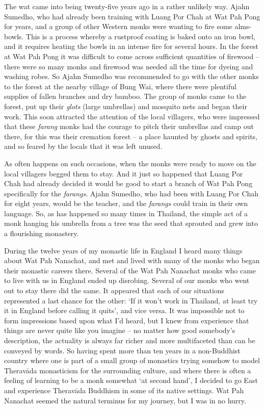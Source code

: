 The wat came into being twenty-five years ago in a rather unlikely way.
Ajahn Sumedho, who had already been training with Luang Por Chah at Wat
Pah Pong for years, and a group of other Western monks were wanting to
fire some alms-bowls. This is a process whereby a rustproof coating is
baked onto an iron bowl, and it requires heating the bowls in an intense
fire for several hours. In the forest at Wat Pah Pong it was difficult
to come across sufficient quantities of firewood -- there were so many
monks and firewood was needed all the time for dyeing and washing robes.
So Ajahn Sumedho was recommended to go with the other monks to the
forest at the nearby village of Bung Wai, where there were plentiful
supplies of fallen branches and dry bamboo. The group of monks came to
the forest, put up their \emph{glots} (large umbrellas) and mosquito
nets and began their work. This soon attracted the attention of the
local villagers, who were impressed that these \emph{farang} monks had
the courage to pitch their umbrellas and camp out there, for this was
their cremation forest -- a place haunted by ghosts and spirits, and so
feared by the locals that it was left unused.

As often happens on such occasions, when the monks were ready to move on
the local villagers begged them to stay. And it just so happened that
Luang Por Chah had already decided it would be good to start a branch of
Wat Pah Pong specifically for the \emph{farangs}. Ajahn Sumedho, who had
been with Luang Por Chah for eight years, would be the teacher, and the
\emph{farangs} could train in their own language. So, as has happened so
many times in Thailand, the simple act of a monk hanging his umbrella
from a tree was the seed that sprouted and grew into a flourishing
monastery.

During the twelve years of my monastic life in England I heard many
things about Wat Pah Nanachat, and met and lived with many of the monks
who began their monastic careers there. Several of the Wat Pah Nanachat
monks who came to live with us in England ended up disrobing. Several of
our monks who went out to stay there did the same. It appeared that each
of our situations represented a last chance for the other: `If it won't
work in Thailand, at least try it in England before calling it quits',
and vice versa. It was impossible not to form impressions based upon
what I'd heard, but I knew from experience that things are never quite
like you imagine -- no matter how good somebody's description, the
actuality is always far richer and more multifaceted than can be
conveyed by words. So having spent more than ten years in a non-Buddhist
country where one is part of a small group of monastics trying somehow
to model Theravāda monasticism for the surrounding culture, and where
there is often a feeling of learning to be a monk somewhat `at second
hand', I decided to go East and experience Theravāda Buddhism in some of
its native settings. Wat Pah Nanachat seemed the natural terminus for my
journey, but I was in no hurry.


